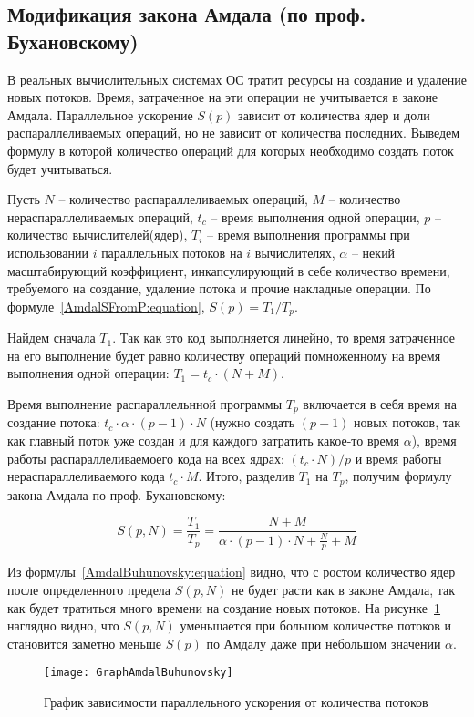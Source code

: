 \subsection{Модификация закона Амдала (по проф. Бухановскому)}

В реальных вычислительных системах ОС тратит ресурсы на создание и удаление новых потоков. Время, затраченное на эти операции не учитывается в законе Амдала. Параллельное ускорение $S(p)$ зависит от количества ядер и доли распараллеливаемых операций, но не зависит от количества последних. Выведем формулу в которой количество операций для которых необходимо создать поток будет учитываться.

Пусть $N$ – количество распараллеливаемых операций, $M$ – количество нераспараллеливаемых операций, $t_c$ – время выполнения одной операции, $p$ – количество вычислителей(ядер), $T_i$ – время выполнения программы при использовании $i$ параллельных потоков на $i$ вычислителях, $\alpha$ – некий масштабирующий коэффициент, инкапсулирующий в себе количество времени, требуемого на создание, удаление потока и прочие накладные операции. 
По формуле~\eqref{AmdalSFromP:equation}, $S(p) = {T_1} / {T_p}$.

Найдем сначала $T_1$. Так как это код выполняется линейно, то время затраченное на его выполнение будет равно количеству операций помноженному на время выполнения одной операции: $T_1 = t_c \cdot (N + M)$. 

Время выполнение распараллельнной программы $T_p$ включается в себя время на создание потока: $t_c \cdot \alpha \cdot (p - 1) \cdot N$ (нужно создать $(p - 1)$ новых потоков, так как главный поток уже создан и для каждого затратить какое-то время $\alpha$), время работы распараллеливаемоего кода на всех ядрах: $(t_c \cdot N) / {p}$ и время работы нераспараллеливаемого кода $t_c \cdot M$. Итого, разделив $T_1$ на $T_p$, получим формулу закона Амдала по проф. Бухановскому:

\begin{equation}
    \label{AmdalBuhunovsky:equation}
    S(p,N) = \frac{T_1}{T_p} = \frac{N + M}{\alpha \cdot (p - 1) \cdot N + \displaystyle\frac{N}{p} + M}
\end{equation}

Из формулы~\eqref{AmdalBuhunovsky:equation} видно, что с ростом количество ядер после определенного предела $S(p,N)$  не будет расти как в законе Амдала, так как будет тратиться много времени на создание новых потоков. На рисунке~\ref{GraphAmdalBuhunovsky:image} наглядно видно, что $S(p,N)$ уменьшается при большом количестве потоков и становится заметно меньше $S(p)$ по Амдалу даже при небольшом значении $\alpha$.

\begin{figure}[H]
    \texttt{[image: GraphAmdalBuhunovsky]}
    \caption{График зависимости параллельного ускорения от количества потоков}
    \label{GraphAmdalBuhunovsky:image}
\end{figure}

